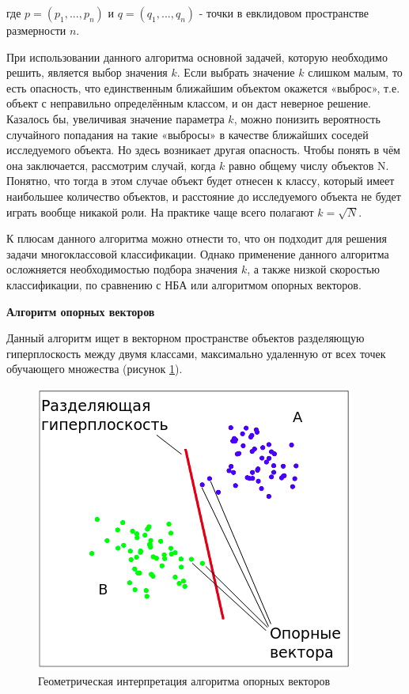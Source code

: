 где $p=(p_1,...,p_n)$ и $q=(q_1,...,q_n)$ - точки в евклидовом пространстве размерности $n$.

При использовании данного алгоритма основной задачей, которую необходимо решить, является выбор значения $k$.
Если выбрать значение $k$ слишком малым, то есть опасность, что единственным ближайшим объектом окажется «выброс», т.е. объект с неправильно определённым классом, и он даст неверное решение. Казалось бы, увеличивая
значение параметра $k$, можно понизить вероятность случайного попадания на такие «выбросы» в качестве ближайших соседей исследуемого объекта. Но здесь возникает другая опасность. Чтобы понять в чём она заключается, рассмотрим случай, когда $k$ равно общему числу объектов N. Понятно, что тогда в этом случае объект будет отнесен к классу, который имеет наибольшее количество объектов, и расстояние до исследуемого объекта не будет играть вообще никакой роли. На практике чаще всего полагают $k=\sqrt{N}$.

К плюсам данного алгоритма можно отнести то, что он подходит для решения задачи многоклассовой классификации. Однако применение данного алгоритма осложняется необходимостью подбора значения $k$, а также низкой скоростью классификации, по сравнению с НБА или алгоритмом опорных векторов.


\vspace{\baselineskip}
\textbf{Алгоритм опорных векторов}

Данный алгоритм ищет в векторном пространстве объектов разделяющую гиперплоскость между двумя классами, максимально удаленную от всех точек обучающего множества (рисунок \ref{anal:SVM}). 

\newpage
\begin{figure}[h!]
	\centering
	\includegraphics[scale=0.7]{inc/img/SVM.png}
	\caption{Геометрическая интерпретация алгоритма опорных векторов}
	\label{anal:SVM}
\end{figure}

